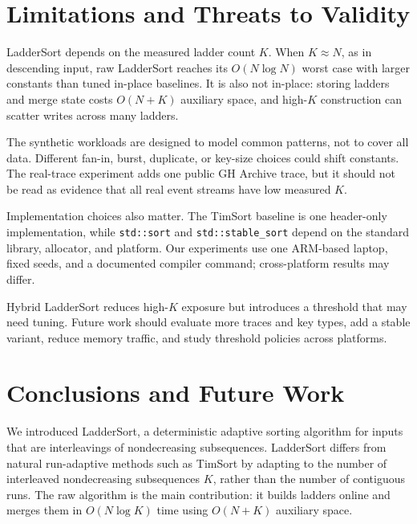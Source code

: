 \documentclass[10pt]{article}
\begin{document}
\section{\texorpdfstring{\textbf{Limitations and Threats to Validity}}{Limitations and Threats to Validity}}\label{limitations-and-threats-to-validity}

LadderSort depends on the measured ladder count \(K\). When \(K\approx N\), as in descending input, raw LadderSort reaches its \(O(N\log N)\) worst case with larger constants than tuned in-place baselines. It is also not in-place: storing ladders and merge state costs \(O(N+K)\) auxiliary space, and high-\(K\) construction can scatter writes across many ladders.

The synthetic workloads are designed to model common patterns, not to cover all data. Different fan-in, burst, duplicate, or key-size choices could shift constants. The real-trace experiment adds one public GH Archive trace, but it should not be read as evidence that all real event streams have low measured \(K\).

Implementation choices also matter. The TimSort baseline is one header-only implementation, while \texttt{std::sort} and \texttt{std::stable\_sort} depend on the standard library, allocator, and platform. Our experiments use one ARM-based laptop, fixed seeds, and a documented compiler command; cross-platform results may differ.

Hybrid LadderSort reduces high-\(K\) exposure but introduces a threshold that may need tuning. Future work should evaluate more traces and key types, add a stable variant, reduce memory traffic, and study threshold policies across platforms.

\section{\texorpdfstring{\textbf{Conclusions and Future Work}}{Conclusions and Future Work}}\label{conclusions-and-future-work}

We introduced LadderSort, a deterministic adaptive sorting algorithm for inputs that are interleavings of nondecreasing subsequences. LadderSort differs from natural run-adaptive methods such as TimSort by adapting to the number of interleaved nondecreasing subsequences \(K\), rather than the number of contiguous runs. The raw algorithm is the main contribution: it builds ladders online and merges them in \(O(N\log K)\) time using \(O(N+K)\) auxiliary space.
\end{document}
